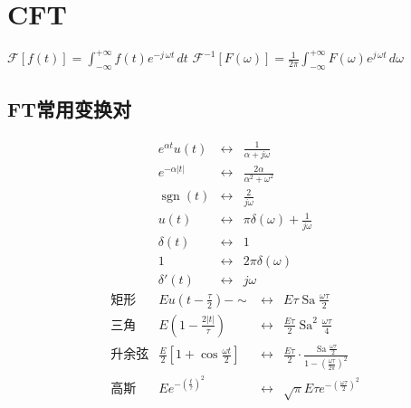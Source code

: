 \section{CFT}

\vspace{-7pt}
\begin{center}
\(\displaystyle \mathcal F[f(t)]=\int_{-\infty}^{+\infty}f(t)e^{-j\,\omega t}\,dt\)
\(\displaystyle \mathcal F^{-1}[F(\omega)] = \frac{1}{2\pi} \int_{-\infty}^{+\infty} F(\omega)e^{j\,\omega t}\,d\omega\)
\end{center}
\vspace{-10pt}

\subsection{FT常用变换对}
\vspace{-7pt}
\[
\begin{array}{lcl}
e^{\alpha t}u(t) & \longleftrightarrow & \frac{1}{\alpha+j\omega} \\
e^{-\alpha|t|} & \longleftrightarrow & \frac{2\alpha}{\alpha^2+\omega^2} \\
\operatorname{sgn}(t) & \longleftrightarrow & \frac{2}{j\omega} \\
u(t) & \longleftrightarrow & \pi\delta(\omega)+\frac{1}{j\omega} \\
\delta(t) & \longleftrightarrow & 1 \\
1 & \longleftrightarrow & 2\pi\delta(\omega) \\
\delta'(t) & \longleftrightarrow & j\omega
\end{array}
\]
\[
\begin{array}{rlcl}
\text{矩形} & Eu\left(t-\frac{\tau}{2}\right)-\sim & \leftrightarrow & E\tau \operatorname{Sa}{\frac{\omega\tau}{2}} \\
\text{三角} & E\left(1-\frac{2|t|}{\tau}\right) & \leftrightarrow & \frac{E\tau}{2}\operatorname{Sa}^2{\frac{\omega\tau}{4}} \\
\text{升余弦} & \frac{E}{2}\left[1+\cos{\frac{\omega t}{2}}\right] & \leftrightarrow & \frac{E\tau}{2}\cdot\frac{\operatorname{Sa}{\frac{\omega\tau}{2}}}{1-\left(\frac{\omega\tau}{2\pi}\right)^2 } \\
\text{高斯} & Ee^{-\left(\frac t\tau\right)^2} & \leftrightarrow & \sqrt{\pi} E\tau e^{-\left(\frac{\omega\tau}{2}\right)^2} \\
\end{array}
\]

